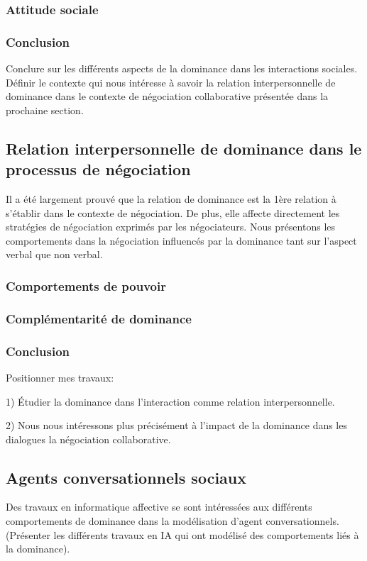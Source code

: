 \documentclass [french]{article}
\begin{document}
			\subsubsection{Attitude sociale} %
			\subsubsection{Conclusion} 
				Conclure sur les différents aspects de la dominance dans les interactions sociales.
				Définir le contexte qui nous intéresse à savoir la relation interpersonnelle de dominance dans le contexte de négociation collaborative présentée dans la prochaine section. 
		\subsection{Relation interpersonnelle de dominance dans le processus de négociation}
			Il a été largement prouvé que la relation de dominance est la 1ère relation à s'établir dans le contexte de négociation. De  plus, elle  affecte directement les stratégies de négociation exprimés par les négociateurs. Nous présentons les comportements dans la négociation influencés par la dominance tant sur l'aspect verbal que non verbal.
			
			\subsubsection{Comportements de pouvoir}  
			
			\subsubsection{Complémentarité de dominance} 
				
			\subsubsection{Conclusion} Positionner mes travaux:
			
			 1) Étudier la dominance dans l'interaction comme relation interpersonnelle. 
			
			2) Nous nous intéressons plus précisément à l'impact de la dominance dans les dialogues la négociation collaborative.
				 

				
				
		\subsection{Agents conversationnels sociaux}
			Des travaux en informatique affective se sont intéressées aux différents comportements de dominance dans la modélisation d'agent conversationnels.
			(Présenter les différents travaux en IA qui ont modélisé des comportements liés à la dominance).
\end{document}
